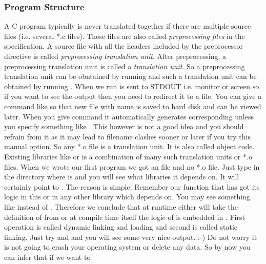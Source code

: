 \subsubsection{Program Structure}
A C program typically is never translated together if there are
multiple source files (i.e. several *.c files). These files are also
called {\it preprocessing files} in the specification. A source file
with all the headers included by the preprocessor directive
 is called {\it preprocessing translation unit}. After
preprocessing, a preprocessing translation unit is called a {\it
  translation unit}. So a preprocessing translation unit can be
obntained by running  and such a translation
unit can be obtained by running . When we run
 is sent to STDOUT i.e. monitor or screen so
if you want to see the output then you need to redirect it to a
file. You can give a command like  so that new file with name
 is saved to hard disk and can be viewed
later. When you give command  it automatically
generates corresponding  unless you specify something
like . This however is
not a good idea and you should refrain from it as it may lead to
filename clashes sooner or later if you try this manual option. So any
*.o file is a translation unit. It is also called object
code. Existing libraries like  or  is a
combination of many such translation units or *.o files. When we wrote
our first program we got an  file and no *.o file. Just type
 in the directory where  is and you will
see what libraries it depends on. It will certainly point to
. The reason is simple. Remember our 
function that has got its logic in this  or in any other
library which  depends on. You may see something like
 instead of
. Therefore we conclude that at runtime either
 will take the definition of  from
 or at compile time itself the logic of  is
embedded in . First operation is called dynamic linking
and loading and second is called static linking. Just try  and  and you will see some very
nice output. :-) Do not worry it is not going to crash your operating
system or delete any data. So by now you can infer that if we want to
